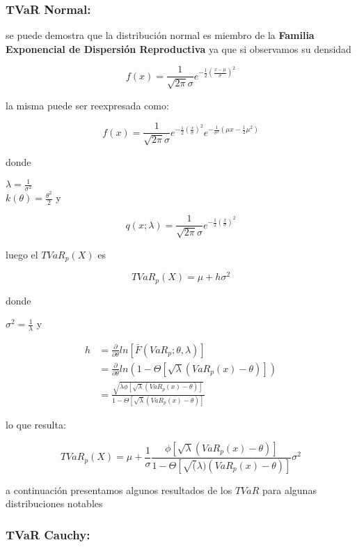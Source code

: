 \documentclass[10pt,]{article}
\begin{document}
\hypertarget{tvar-normal}{%
\subsubsection{\texorpdfstring{\textbf{TVaR
Normal:}}{TVaR Normal:}}\label{tvar-normal}}

se puede demostra que la distribución normal es miembro de la
\textbf{Familia Exponencial de Dispersión Reproductiva} ya que si
observamos su densidad

\[f(x)=\frac{1}{\sqrt{2 \pi}\sigma} e^{-\frac{1}{2}\left(\frac{x - \mu}{\sigma}\right)^2}\]

la misma puede ser reexpresada como:

\[f(x)=\frac{1}{\sqrt{2 \pi}\sigma} e^{-\frac{1}{2}\left(\frac{x}{\sigma}\right)^2}e^{-\frac{1}{\sigma^2}\left(\mu x -\frac{1}{2} \mu ^2\right)}\]

donde

\(\lambda = \frac{1}{\sigma^2}\)\\
\(k(\theta)= \frac{\theta^2}{2}\) y

\[q(x; \lambda) = \frac{1}{\sqrt{2 \pi}\sigma}e^{-\frac{1}{2}\left(\frac{x}{\sigma}\right)^2}\]

luego el \(TVaR_p(X)\) es

\[TVaR_p(X)= \mu + h \sigma^2\]

donde

\(\sigma^2= \frac{1}{\lambda}\) y

\[\begin{array}{rl}
h &\displaystyle =\frac{\partial}{\partial \theta}ln[\bar{F}(VaR_p; \theta, \lambda)]\\
&\displaystyle =\frac{\partial}{\partial \theta}ln(1-\Theta[\sqrt{\lambda}(VaR_p(x)-\theta)])\\
&\displaystyle = \frac{\sqrt{\lambda \phi[\sqrt{\lambda}(VaR_p(x)-\theta)]}}{1-\Theta[\sqrt{\lambda}(VaR_p(x)- \theta)]}
\end{array}\]

lo que resulta:

\[TVaR_p(X) = \mu + \frac{1}{\sigma} \frac{\phi[\sqrt{\lambda}(VaR_p(x)- \theta)]}{1-\Theta[\sqrt(\lambda)(VaR_p(x)- \theta)]} \sigma^2\]

a continuación presentamos algunos resultados de los \(TVaR\) para
algunas distribuciones notables

\hypertarget{tvar-cauchy}{%
\subsubsection{\texorpdfstring{\textbf{TVaR
Cauchy:}}{TVaR Cauchy:}}\label{tvar-cauchy}}
\end{document}
